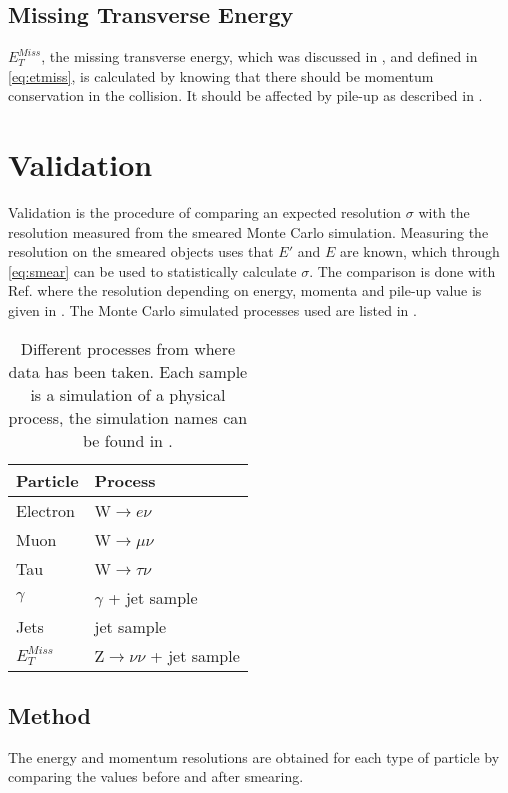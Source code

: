 \subsection{Missing Transverse Energy}
$E_T^{Miss}$, the missing transverse energy, which was discussed in , and defined in \eqref{eq:etmiss}, is calculated by knowing that there should be momentum conservation in the collision. It should be affected by pile-up as described in .

\newpage
\section{Validation}\label{sec:vali}
Validation is the procedure of comparing an expected resolution $\sigma$ with the resolution measured from the smeared Monte Carlo simulation. Measuring the resolution on the smeared objects uses that $E'$ and $E$ are known, which through \eqref{eq:smear} can be used to statistically calculate $\sigma$. The comparison is done with Ref. \citep{ATL-PHYS-PUB-2013-004} where the resolution depending on energy, momenta and pile-up value is given in . The Monte Carlo simulated processes used are listed in . 

\begin{SCtable}[][ht]
\begin{tabular}{|l|l|}
\hline
Particle & Process \\ \hline
Electron & W$\rightarrow e\nu$ \\
Muon & W$\rightarrow \mu \nu$ \\
Tau & W$\rightarrow \tau \nu$ \\
$\gamma$ & $\gamma$ + jet sample \\
Jets & jet sample \\
$E_T^{Miss}$ & Z$\rightarrow \nu \nu$ + jet sample \\ \hline
\end{tabular}
\caption{Different processes from where data has been taken. Each sample is a simulation of a physical process, the simulation names can be found in .}
\label{tab:backproc}
\end{SCtable}

\subsection{Method}
The energy and momentum resolutions are obtained for each type of particle by comparing the values before and after smearing.

